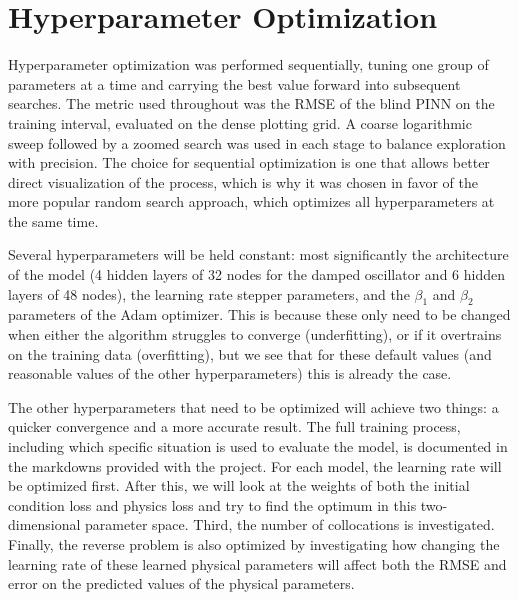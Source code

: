 \documentclass[12pt, a4paper]{report}
\begin{document}
\section{Hyperparameter Optimization}
Hyperparameter optimization was performed sequentially, tuning one group of parameters at a time and carrying the best value forward into subsequent searches. The metric used throughout was the RMSE of the blind PINN on the training interval, evaluated on the dense plotting grid. A coarse logarithmic sweep followed by a zoomed search was used in each stage to balance exploration with precision. The choice for sequential optimization is one that allows better direct visualization of the process, which is why it was chosen in favor of the more popular random search approach, which optimizes all hyperparameters at the same time. 

Several hyperparameters will be held constant: most significantly the architecture of the model (4 hidden layers of 32 nodes for the damped oscillator and 6 hidden layers of 48 nodes), the learning rate stepper parameters, and the $\beta_1$ and $\beta_2$ parameters of the Adam optimizer. This is because these only need to be changed when either the algorithm struggles to converge (underfitting), or if it overtrains on the training data (overfitting), but we see that for these default values (and reasonable values of the other hyperparameters) this is already the case. 

The other hyperparameters that need to be optimized will achieve two things: a quicker convergence and a more accurate result. The full training process, including which specific situation is used to evaluate the model, is documented in the markdowns provided with the project. For each model, the learning rate will be optimized first. After this, we will look at the weights of both the initial condition loss and physics loss and try to find the optimum in this two-dimensional parameter space. Third, the number of collocations is investigated. Finally, the reverse problem is also optimized by investigating how changing the learning rate of these learned physical parameters will affect both the RMSE and error on the predicted values of the physical parameters.
\end{document}
